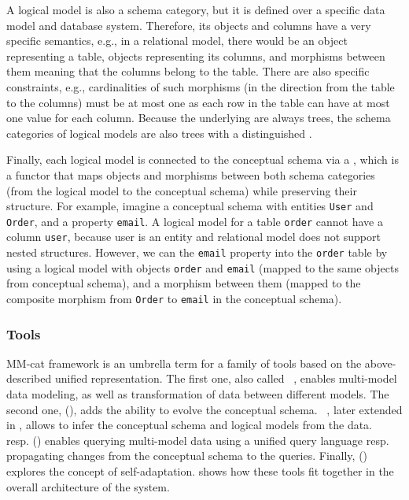 A logical model is also a schema category, but it is defined over a specific data model and database system. Therefore, its objects and columns have a very specific semantics, e.g., in a relational model, there would be an object representing a table, objects representing its columns, and morphisms between them meaning that the columns belong to the table. There are also specific constraints, e.g., cardinalities of such morphisms (in the direction from the table to the columns) must be at most one as each row in the table can have at most one value for each column. Because the underlying  are always trees, the schema categories of logical models are also trees with a distinguished .


Finally, each logical model is connected to the conceptual schema via a , which is a functor that maps objects and morphisms between both schema categories (from the logical model to the conceptual schema) while preserving their structure. For example,  imagine a conceptual schema with entities \texttt{User} and \texttt{Order}, and a property \texttt{email}. A logical model for a table \texttt{order} cannot have a column \texttt{user}, because user is an entity and relational model does not support nested structures. However, we can  the \texttt{email} property into the \texttt{order} table by using a logical model with objects \texttt{order} and \texttt{email} (mapped to the same objects from conceptual schema), and a morphism between them (mapped to the composite morphism from \texttt{Order} to \texttt{email} in the conceptual schema). 


\subsubsection{Tools}

MM-cat framework is an umbrella term for a family of tools based on the above-described unified representation. The first one, also called ~\citep{mm_cat}, enables multi-model data modeling, as well as transformation of data between different models. The second one,  (), adds the ability to evolve the conceptual schema. ~\citep{mm_infer}, later extended in , allows to infer the conceptual schema and logical models from the data. ~\citep{mm_quecat} resp.  () enables querying multi-model data using a unified query language resp. propagating changes from the conceptual schema to the queries. Finally,  () explores the concept of self-adaptation.   shows how these tools fit together in the overall architecture of the system.

